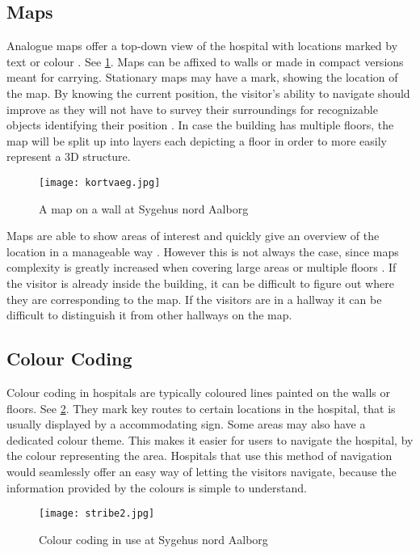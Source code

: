 \subsection{Maps} \label{sub:map}
Analogue maps \cite{map} offer a top-down view of the hospital with locations marked by text or colour \cite{art_Osborne}. See \cref{fig:map}. Maps can be affixed to walls or made in compact versions meant for carrying. Stationary maps may have a mark, showing the location of the map. By knowing the current position, the visitor's ability to navigate should improve as they will not have to survey their surroundings for recognizable objects identifying their position \cite{map_survey}. In case the building has multiple floors, the map will be split up into layers each depicting a floor in order to more easily represent a 3D structure.

  \begin{figure}[!h]
  \centering
  \texttt{[image: kortvaeg.jpg]}
  \caption{A map on a wall at Sygehus nord Aalborg}
  \label{fig:map}
  \end{figure}

Maps are able to show areas of interest and quickly give an overview of the location in a manageable way \cite{pros_analog_map}. However this is not always the case, since maps complexity is greatly increased when covering large areas or multiple floors \cite{map_confusing}. If the visitor is already inside the building, it can be difficult to figure out where they are corresponding to the map. If the visitors are in a hallway it can be difficult to distinguish it from other hallways on the map.

\subsection{Colour Coding}\label{sub:col}
Colour coding in hospitals are typically coloured lines painted on the walls or floors. See \cref{fig:colour_floor}. They mark key routes to certain locations in the hospital, that is usually displayed by a accommodating sign. Some areas may also have a dedicated colour theme. This makes it easier for users to navigate the hospital, by the colour representing the area.
Hospitals that use this method of navigation would seamlessly offer an easy way of letting the visitors navigate, because the information provided by the colours is simple to understand.

\begin{figure}[!h]
  \begin{center} 
    \texttt{[image: stribe2.jpg]}
  \end{center}
  \caption{Colour coding in use at Sygehus nord Aalborg}
  \label{fig:colour_floor}
\end{figure}


